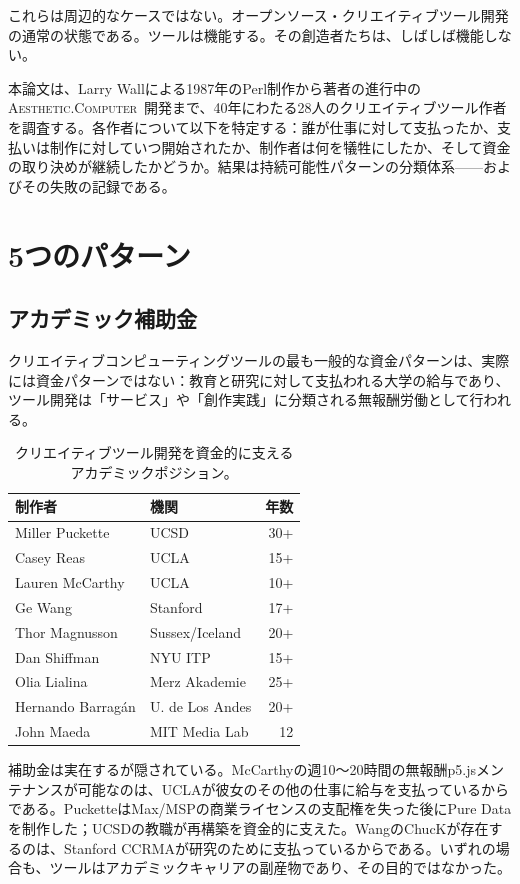 \documentclass[10pt,letterpaper,twocolumn]{article}
\newcommand{\ac}{\textsc{Aesthetic.Computer}}
\begin{document}
これらは周辺的なケースではない。オープンソース・クリエイティブツール開発の通常の状態である。ツールは機能する。その創造者たちは、しばしば機能しない。

本論文は、Larry Wallによる1987年のPerl制作から著者の進行中の\ac{}~\citep{scudder2026ac}開発まで、40年にわたる28人のクリエイティブツール作者を調査する。各作者について以下を特定する：誰が仕事に対して支払ったか、支払いは制作に対していつ開始されたか、制作者は何を犠牲にしたか、そして資金の取り決めが継続したかどうか。結果は持続可能性パターンの分類体系——およびその失敗の記録である。

\section{5つのパターン}

\subsection{アカデミック補助金}

クリエイティブコンピューティングツールの最も一般的な資金パターンは、実際には資金パターンではない：教育と研究に対して支払われる大学の給与であり、ツール開発は「サービス」や「創作実践」に分類される無報酬労働として行われる。

\begin{table}[h]
\small
\centering
\begin{tabularx}{\columnwidth}{Xlr}
\toprule
\textbf{制作者} & \textbf{機関} & \textbf{年数} \\
\midrule
Miller Puckette & UCSD & 30+ \\
Casey Reas & UCLA & 15+ \\
Lauren McCarthy & UCLA & 10+ \\
Ge Wang & Stanford & 17+ \\
Thor Magnusson & Sussex/Iceland & 20+ \\
Dan Shiffman & NYU ITP & 15+ \\
Olia Lialina & Merz Akademie & 25+ \\
Hernando Barrag\'an & U. de Los Andes & 20+ \\
John Maeda & MIT Media Lab & 12 \\
\bottomrule
\end{tabularx}
\caption{クリエイティブツール開発を資金的に支えるアカデミックポジション。}
\label{tab:academic}
\end{table}

補助金は実在するが隠されている。McCarthyの週10〜20時間の無報酬p5.jsメンテナンスが可能なのは、UCLAが彼女のその他の仕事に給与を支払っているからである。PucketteはMax/MSPの商業ライセンスの支配権を失った後にPure Dataを制作した；UCSDの教職が再構築を資金的に支えた。WangのChucKが存在するのは、Stanford CCRMAが研究のために支払っているからである。いずれの場合も、ツールはアカデミックキャリアの副産物であり、その目的ではなかった。
\end{document}
